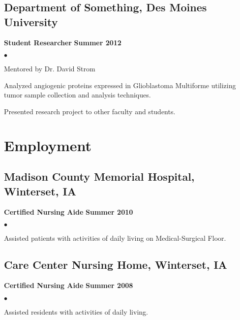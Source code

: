 \documentclass[11pt,letterpaper]{article}
\renewenvironment{itemize}{
  \begin{list}{}{
      \setlength{\leftmargin}{1.5em}
      \setlength{\itemsep}{0.25em}
      \setlength{\parskip}{0pt}
      \setlength{\parsep}{0.25em}
    }
  }{
  \end{list}
}
\newenvironment{bitemize}{
  \begin{list}{$\bullet$}{
      \setlength{\leftmargin}{1.5em}
      \setlength{\itemsep}{0.25em}
      \setlength{\parskip}{0pt}
      \setlength{\parsep}{0.25em}
    }
  }{
  \end{list}
}
\newcommand{\yearrange}[1]{\hfill \textbf{#1} \par}
\begin{document}
\subsection*{Department of Something, Des Moines University}
\begin{itemize}
\item \textbf{Student Researcher} \yearrange{Summer 2012}
  \begin{bitemize}
  \item Mentored by Dr. David Strom
  \item Analyzed angiogenic proteins expressed in Glioblastoma
    Multiforme utilizing tumor sample collection and analysis
    techniques. 
  \item Presented research project to other faculty and students.
  \end{bitemize}
\end{itemize}


\section*{Employment}

\subsection*{Madison County Memorial Hospital, Winterset, IA}
\begin{itemize}
\item \textbf{Certified Nursing Aide} \yearrange{Summer 2010}
  \begin{bitemize}
    \item Assisted patients with activities of daily living on Medical-Surgical Floor.
  \end{bitemize}
\end{itemize}

\subsection*{Care Center Nursing Home, Winterset, IA}
\begin{itemize}
\item \textbf{Certified Nursing Aide} \yearrange{Summer 2008}
  \begin{bitemize}
    \item Assisted residents with activities of daily living.
  \end{bitemize}
\end{itemize}
\end{document}
